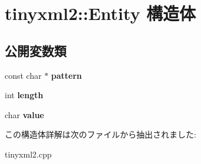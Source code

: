 \hypertarget{structtinyxml2_1_1_entity}{}\section{tinyxml2\+:\+:Entity 構造体}
\label{structtinyxml2_1_1_entity}
\subsection*{公開変数類}
\begin{DoxyCompactItemize}
\item 
\mbox{\label{structtinyxml2_1_1_entity_ab330f5d665d29bfc811ecfa76315894b}} 
const char $\ast$ {\bfseries pattern}
\item 
\mbox{\label{structtinyxml2_1_1_entity_a25e2b57cb59cb4fa68f283d7cb570f21}} 
int {\bfseries length}
\item 
\mbox{\label{structtinyxml2_1_1_entity_a7334e81e33b4615655a403711b24f3ed}} 
char {\bfseries value}
\end{DoxyCompactItemize}


この構造体詳解は次のファイルから抽出されました\+:\begin{DoxyCompactItemize}
\item 
tinyxml2.\+cpp\end{DoxyCompactItemize}
